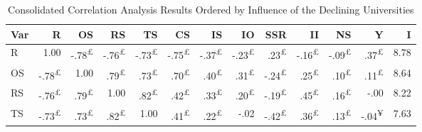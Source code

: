 \documentclass{singlecol-new}
\theoremstyle{TH}{
\newtheorem{lemma}{Lemma}
\newtheorem{theorem}[lemma]{Theorem}
\newtheorem{corrolary}[lemma]{Corrolary}
\newtheorem{conjecture}[lemma]{Conjecture}
\newtheorem{proposition}[lemma]{Proposition}
\newtheorem{claim}[lemma]{Claim}
\newtheorem{stheorem}[lemma]{Wrong Theorem}
\newtheorem{algorithm}{Algorithm}
}
\theoremstyle{THrm}{
\newtheorem{definition}{Definition}[section]
\newtheorem{question}{Question}[section]
\newtheorem{remark}{Remark}
\newtheorem{scheme}{Scheme}
}
\theoremstyle{THhit}{
\newtheorem{case}{Case}[section]
}
\begin{document}
\begin{table*}[h!]
	\centering
	\caption{Consolidated Correlation Analysis Results Ordered by Influence of the Declining Universities}
	\label{tab:correlation_combined_colored}
	\scriptsize
	\begin{tabular}{lrrrrrrrrrrrr}
		\hline
		\textbf{Var} & \textbf{R} & \textbf{OS} & \textbf{RS} & \textbf{TS} & \textbf{CS} & \textbf{IS} & \textbf{IO} & \textbf{SSR} & \textbf{II} & \textbf{NS} & \textbf{Y} & \textbf{I} \\ \hline
		
		R  & \cellcolor{gray!50}1.00 & \cellcolor{gray!39}-.78\textsuperscript{£} & \cellcolor{gray!38}-.76\textsuperscript{£} & \cellcolor{gray!36}-.73\textsuperscript{£} & \cellcolor{gray!37}-.75\textsuperscript{£} & \cellcolor{gray!18}-.37\textsuperscript{£} & \cellcolor{gray!11}-.23\textsuperscript{£} & \cellcolor{gray!11}.23\textsuperscript{£} & \cellcolor{gray!8}-.16\textsuperscript{£} & \cellcolor{gray!4}-.09\textsuperscript{£} & \cellcolor{gray!18}.37\textsuperscript{£} & 8.78 \\
		OS & \cellcolor{gray!39}-.78\textsuperscript{£} & \cellcolor{gray!50}1.00 & \cellcolor{gray!39}.79\textsuperscript{£} & \cellcolor{gray!36}.73\textsuperscript{£} & \cellcolor{gray!35}.70\textsuperscript{£} & \cellcolor{gray!20}.40\textsuperscript{£} & \cellcolor{gray!15}.31\textsuperscript{£} & \cellcolor{gray!12}-.24\textsuperscript{£} & \cellcolor{gray!12}.25\textsuperscript{£} & \cellcolor{gray!5}.10\textsuperscript{£} & \cellcolor{gray!5}.11\textsuperscript{£} & 8.64 \\
		RS & \cellcolor{gray!38}-.76\textsuperscript{£} & \cellcolor{gray!39}.79\textsuperscript{£} & \cellcolor{gray!50}1.00 & \cellcolor{gray!41}.82\textsuperscript{£} & \cellcolor{gray!21}.42\textsuperscript{£} & \cellcolor{gray!16}.33\textsuperscript{£} & \cellcolor{gray!10}.20\textsuperscript{£} & \cellcolor{gray!9}-.19\textsuperscript{£} & \cellcolor{gray!22}.45\textsuperscript{£} & \cellcolor{gray!8}.16\textsuperscript{£} & \cellcolor{gray!0}-.00 & 8.22 \\
		TS & \cellcolor{gray!36}-.73\textsuperscript{£} & \cellcolor{gray!36}.73\textsuperscript{£} & \cellcolor{gray!41}.82\textsuperscript{£} & \cellcolor{gray!50}1.00 & \cellcolor{gray!20}.41\textsuperscript{£} & \cellcolor{gray!11}.22\textsuperscript{£} & \cellcolor{gray!1}-.02 & \cellcolor{gray!21}-.42\textsuperscript{£} & \cellcolor{gray!18}.36\textsuperscript{£} & \cellcolor{gray!6}.13\textsuperscript{£} & \cellcolor{gray!2}-.04\textsuperscript{¥} & 7.63 \\

\end{tabular}
\end{table*}
\end{document}
